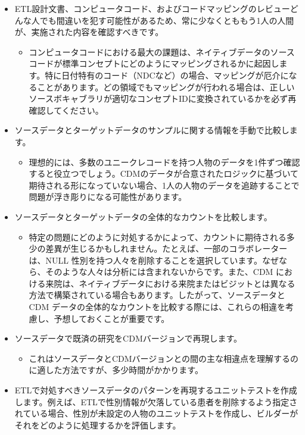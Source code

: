 \documentclass[
  11pt]{book}
\providecommand{\tightlist}{%
  \setlength{\itemsep}{0pt}\setlength{\parskip}{0pt}}
\theoremstyle{definition}
\theoremstyle{definition}
\theoremstyle{definition}
\theoremstyle{definition}
\theoremstyle{remark}
\begin{document}
\begin{itemize}
\tightlist
\item
  ETL設計文書、コンピュータコード、およびコードマッピングのレビューどんな人でも間違いを犯す可能性があるため、常に少なくとももう1人の人間が、実施された内容を確認すべきです。

  \begin{itemize}
  \tightlist
  \item
    コンピュータコードにおける最大の課題は、ネイティブデータのソースコードが標準コンセプトにどのようにマッピングされるかに起因します。特に日付特有のコード（NDCなど）の場合、マッピングが厄介になることがあります。どの領域でもマッピングが行われる場合は、正しいソースボキャブラリが適切なコンセプトIDに変換されているかを必ず再確認してください。
  \end{itemize}
\item
  ソースデータとターゲットデータのサンプルに関する情報を手動で比較します。

  \begin{itemize}
  \tightlist
  \item
    理想的には、多数のユニークレコードを持つ人物のデータを1件ずつ確認すると役立つでしょう。CDMのデータが合意されたロジックに基づいて期待される形になっていない場合、1人の人物のデータを追跡することで問題が浮き彫りになる可能性があります。
  \end{itemize}
\item
  ソースデータとターゲットデータの全体的なカウントを比較します。

  \begin{itemize}
  \tightlist
  \item
    特定の問題にどのように対処するかによって、カウントに期待される多少の差異が生じるかもしれません。たとえば、一部のコラボレーターは、NULL 性別を持つ人々を削除することを選択しています。なぜなら、そのような人々は分析には含まれないからです。また、CDM における来院は、ネイティブデータにおける来院またはビジットとは異なる方法で構築されている場合もあります。したがって、ソースデータと CDM データの全体的なカウントを比較する際には、これらの相違を考慮し、予想しておくことが重要です。
  \end{itemize}
\item
  ソースデータで既済の研究をCDMバージョンで再現します。

  \begin{itemize}
  \tightlist
  \item
    これはソースデータとCDMバージョンとの間の主な相違点を理解するのに適した方法ですが、多少時間がかかります。
  \end{itemize}
\item
  ETLで対処すべきソースデータのパターンを再現するユニットテストを作成します。例えば、ETLで性別情報が欠落している患者を削除するよう指定されている場合、性別が未設定の人物のユニットテストを作成し、ビルダーがそれをどのように処理するかを評価します。


\end{itemize}
\end{document}
